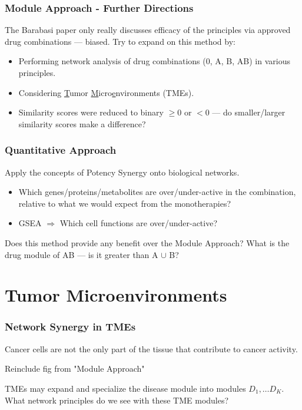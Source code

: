 \documentclass{beamer}
\begin{document}
\begin{frame}
  \frametitle{Module Approach - Further Directions}
  The Barabasi paper only really discusses efficacy of the principles via approved drug combinations --- biased.
  \vfill
  Try to expand on this method by:
  \begin{itemize}
      \item Performing network analysis of drug combinations (0, A, B, AB) in various principles.
      \item Considering \underline{T}umor \underline{M}icro\underline{e}nvironments (TMEs).
      \item Similarity scores were reduced to binary $\geq0$ or $<0$ --- do smaller/larger similarity scores make a difference?
  \end{itemize}
\end{frame}

\begin{frame}
  \frametitle{Quantitative Approach}

  Apply the concepts of Potency Synergy onto biological networks.

  \begin{itemize}
    \item Which genes/proteins/metabolites are over/under-active in the combination, relative to what we would expect from the monotherapies?
    \item GSEA $\Rightarrow$ Which cell functions are over/under-active?
  \end{itemize}

  \vfill

  Does this method provide any benefit over the Module Approach? What is the drug module of AB --- is it greater than A $\cup$ B?
\end{frame}

\section{Tumor Microenvironments}

\begin{frame}
  \frametitle{Network Synergy in TMEs}
  Cancer cells are not the only part of the tissue that contribute to cancer activity.

  Reinclude fig from "Module Approach"

  TMEs may expand and specialize the disease module into modules $D_1, \ldots D_K$. 
  What network principles do we see with these TME modules?
\end{frame}
\end{document}
